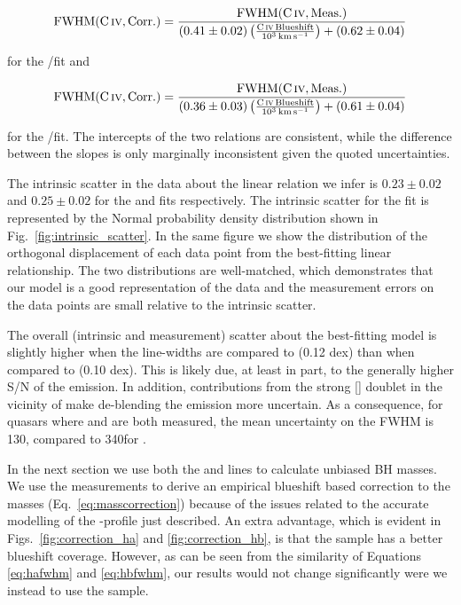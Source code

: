 \begin{equation}
    \label{eq:hafwhm}
    \rm{FWHM}(\rm{C}\,\textsc{iv}, \rm{Corr.}) = \frac{\rm{FWHM}(\rm{C}\,\textsc{iv}, \rm{Meas.})}{ (0.41\pm0.02) \left(\frac{\rm{C}\,\textsc{iv}\, Blueshift}{10^3 {\rm \,km\,s^{-1}}} \right) + (0.62\pm0.04)}
\end{equation}

\noindent for the /\ha fit and 

\begin{equation}
    \label{eq:hbfwhm}
    \rm{FWHM}(\rm{C}\,\textsc{iv}, \rm{Corr.}) = \frac{\rm{FWHM}(\rm{C}\,\textsc{iv}, \rm{Meas.})}{ (0.36\pm0.03) \left(\frac{\rm{C}\,\textsc{iv}\, Blueshift}{10^3 {\rm \,km\,s^{-1}}} \right) + (0.61\pm0.04)}
\end{equation}

\noindent for the /\hb fit. 
The intercepts of the two relations are consistent, while the difference between the slopes is only marginally inconsistent given the quoted uncertainties. 

The intrinsic scatter in the data about the linear relation we infer is $0.23 \pm 0.02$ and $0.25 \pm 0.02$ for the \ha and \hb fits respectively. 
The intrinsic scatter for the \ha fit is represented by the Normal probability density distribution shown in Fig.~\ref{fig:intrinsic_scatter}. 
In the same figure we show the distribution of the orthogonal displacement of each data point from the best-fitting linear relationship. 
The two distributions are well-matched, which demonstrates that our model is a good representation of the data and the measurement errors on the data points are small relative to the intrinsic scatter.    

The overall (intrinsic and measurement) scatter about the best-fitting model is slightly higher when the  line-widths are compared to \hb (0.12 dex) than when compared to \ha (0.10 dex). 
This is likely due, at least in part, to the generally higher S/N of the \ha emission. 
In addition, contributions from the strong [] doublet in the vicinity of \hb make de-blending the \hb emission more uncertain. 
As a consequence, for quasars where \ha and \hb are both measured, the mean uncertainty on the \ha FWHM is 130\kms, compared to 340\kms for \hbns. 

In the next section we use both the \ha and \hb lines to calculate unbiased BH masses. 
We use the \ha measurements to derive an empirical  blueshift based correction to the  masses (Eq.~\ref{eq:masscorrection}) because of the issues related to the accurate modelling of the \hbns-profile just described.  
An extra advantage, which is evident in Figs.~\ref{fig:correction_ha} and \ref{fig:correction_hb}, is that the \ha sample has a better  blueshift coverage. 
However, as can be seen from the similarity of Equations \ref{eq:hafwhm} and \ref{eq:hbfwhm}, our results would not change significantly were we instead to use the \hb sample. 

